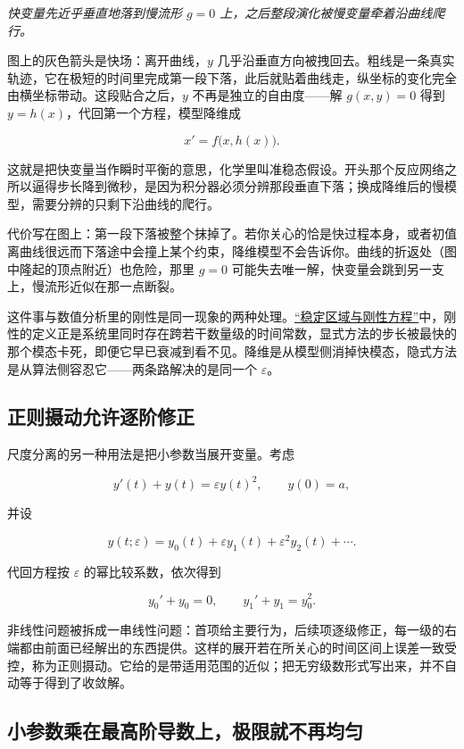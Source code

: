 \emph{快变量先近乎垂直地落到慢流形 \(g=0\) 上，之后整段演化被慢变量牵着沿曲线爬行。}

图上的灰色箭头是快场：离开曲线，\(y\) 几乎沿垂直方向被拽回去。粗线是一条真实轨迹，它在极短的时间里完成第一段下落，此后就贴着曲线走，纵坐标的变化完全由横坐标带动。这段贴合之后，\(y\) 不再是独立的自由度——解 \(g(x,y)=0\) 得到 \(y=h(x)\)，代回第一个方程，模型降维成

\[
x'=f\bigl(x,h(x)\bigr).
\]

这就是把快变量当作瞬时平衡的意思，化学里叫准稳态假设。开头那个反应网络之所以逼得步长降到微秒，是因为积分器必须分辨那段垂直下落；换成降维后的慢模型，需要分辨的只剩下沿曲线的爬行。

代价写在图上：第一段下落被整个抹掉了。若你关心的恰是快过程本身，或者初值离曲线很远而下落途中会撞上某个约束，降维模型不会告诉你。曲线的折返处（图中隆起的顶点附近）也危险，那里 \(g=0\) 可能失去唯一解，快变量会跳到另一支上，慢流形近似在那一点断裂。

这件事与数值分析里的刚性是同一现象的两种处理。\hyperref[sec:08-Numerical-Analysis/06-ODE/03]{``稳定区域与刚性方程''}中，刚性的定义正是系统里同时存在跨若干数量级的时间常数，显式方法的步长被最快的那个模态卡死，即便它早已衰减到看不见。降维是从模型侧消掉快模态，隐式方法是从算法侧容忍它——两条路解决的是同一个 \(\varepsilon\)。

\subsection{正则摄动允许逐阶修正}

尺度分离的另一种用法是把小参数当展开变量。考虑

\[
y'(t)+y(t)=\varepsilon y(t)^2,
\qquad y(0)=a,
\]

并设

\[
y(t;\varepsilon)=y_0(t)+\varepsilon y_1(t)+\varepsilon^2y_2(t)+\cdots.
\]

代回方程按 \(\varepsilon\) 的幂比较系数，依次得到

\[
y_0'+y_0=0,
\qquad
y_1'+y_1=y_0^2.
\]

非线性问题被拆成一串线性问题：首项给主要行为，后续项逐级修正，每一级的右端都由前面已经解出的东西提供。这样的展开若在所关心的时间区间上误差一致受控，称为正则摄动。它给的是带适用范围的近似；把无穷级数形式写出来，并不自动等于得到了收敛解。

\subsection{小参数乘在最高阶导数上，极限就不再均匀}

